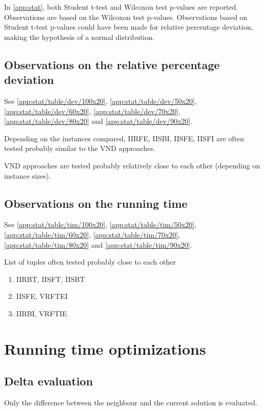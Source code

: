 \documentclass[a4paper,12pt]{article}
\begin{document}
In \ref{app:stat}, both Student t-test and Wilcoxon test p-values are reported. Observations are based on the Wilcoxon test p-values. Observations based on Student t-test p-values could have been made for relative percentage deviation, making the hypothesis of a normal distribution.

\subsection{Observations on the relative percentage deviation}

See \ref{app:stat/table/dev/100x20}, \ref{app:stat/table/dev/50x20}, \ref{app:stat/table/dev/60x20}, \ref{app:stat/table/dev/70x20}, \ref{app:stat/table/dev/80x20} and \ref{app:stat/table/dev/90x20}.

Depending on the instances compared, IIRFE, IISBI, IISFE, IISFI are often tested probably similar to the VND approaches.

VND approaches are tested probably relatively close to each other (depending on instance sizes).

\subsection{Observations on the running time}

See \ref{app:stat/table/tim/100x20}, \ref{app:stat/table/tim/50x20}, \ref{app:stat/table/tim/60x20}, \ref{app:stat/table/tim/70x20}, \ref{app:stat/table/tim/80x20} and \ref{app:stat/table/tim/90x20}.

List of tuples often tested probably close to each other

\begin{enumerate}
	\item IIRBT, IISFT, IISBT
	\item IISFE, VRFTEI
	\item IIRBI, VRFTIE
\end{enumerate}

\newpage\cleardoublepage{}
\section{Running time optimizations}

\subsection{Delta evaluation}

Only the difference between the neighbour and the current solution is evaluated.
\end{document}
